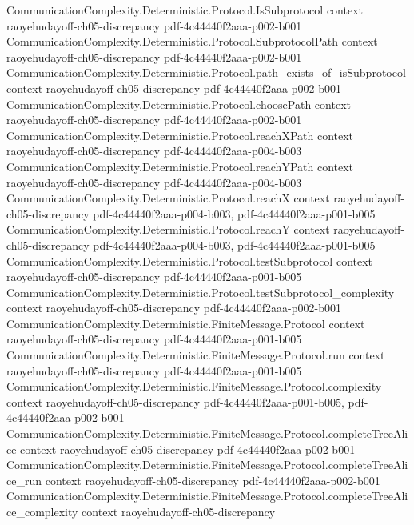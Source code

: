 \begin{theorem}
\proofstep
  {CommunicationComplexity.Deterministic.Protocol.IsSubprotocol}
  {context}
  {raoyehudayoff-ch05-discrepancy}
  {pdf-4c44440f2aaa-p002-b001}
\proofstep
  {CommunicationComplexity.Deterministic.Protocol.SubprotocolPath}
  {context}
  {raoyehudayoff-ch05-discrepancy}
  {pdf-4c44440f2aaa-p002-b001}
\proofstep
  {CommunicationComplexity.Deterministic.Protocol.path_exists_of_isSubprotocol}
  {context}
  {raoyehudayoff-ch05-discrepancy}
  {pdf-4c44440f2aaa-p002-b001}
\proofstep
  {CommunicationComplexity.Deterministic.Protocol.choosePath}
  {context}
  {raoyehudayoff-ch05-discrepancy}
  {pdf-4c44440f2aaa-p002-b001}
\proofstep
  {CommunicationComplexity.Deterministic.Protocol.reachXPath}
  {context}
  {raoyehudayoff-ch05-discrepancy}
  {pdf-4c44440f2aaa-p004-b003}
\proofstep
  {CommunicationComplexity.Deterministic.Protocol.reachYPath}
  {context}
  {raoyehudayoff-ch05-discrepancy}
  {pdf-4c44440f2aaa-p004-b003}
\proofstep
  {CommunicationComplexity.Deterministic.Protocol.reachX}
  {context}
  {raoyehudayoff-ch05-discrepancy}
  {pdf-4c44440f2aaa-p004-b003,
    pdf-4c44440f2aaa-p001-b005}
\proofstep
  {CommunicationComplexity.Deterministic.Protocol.reachY}
  {context}
  {raoyehudayoff-ch05-discrepancy}
  {pdf-4c44440f2aaa-p004-b003,
    pdf-4c44440f2aaa-p001-b005}
\proofstep
  {CommunicationComplexity.Deterministic.Protocol.testSubprotocol}
  {context}
  {raoyehudayoff-ch05-discrepancy}
  {pdf-4c44440f2aaa-p001-b005}
\proofstep
  {CommunicationComplexity.Deterministic.Protocol.testSubprotocol_complexity}
  {context}
  {raoyehudayoff-ch05-discrepancy}
  {pdf-4c44440f2aaa-p002-b001}
\proofstep
  {CommunicationComplexity.Deterministic.FiniteMessage.Protocol}
  {context}
  {raoyehudayoff-ch05-discrepancy}
  {pdf-4c44440f2aaa-p001-b005}
\proofstep
  {CommunicationComplexity.Deterministic.FiniteMessage.Protocol.run}
  {context}
  {raoyehudayoff-ch05-discrepancy}
  {pdf-4c44440f2aaa-p001-b005}
\proofstep
  {CommunicationComplexity.Deterministic.FiniteMessage.Protocol.complexity}
  {context}
  {raoyehudayoff-ch05-discrepancy}
  {pdf-4c44440f2aaa-p001-b005,
    pdf-4c44440f2aaa-p002-b001}
\proofstep
  {CommunicationComplexity.Deterministic.FiniteMessage.Protocol.completeTreeAlice}
  {context}
  {raoyehudayoff-ch05-discrepancy}
  {pdf-4c44440f2aaa-p002-b001}
\proofstep
  {CommunicationComplexity.Deterministic.FiniteMessage.Protocol.completeTreeAlice_run}
  {context}
  {raoyehudayoff-ch05-discrepancy}
  {pdf-4c44440f2aaa-p002-b001}
\proofstep
  {CommunicationComplexity.Deterministic.FiniteMessage.Protocol.completeTreeAlice_complexity}
  {context}
  {raoyehudayoff-ch05-discrepancy}

\end{theorem}
